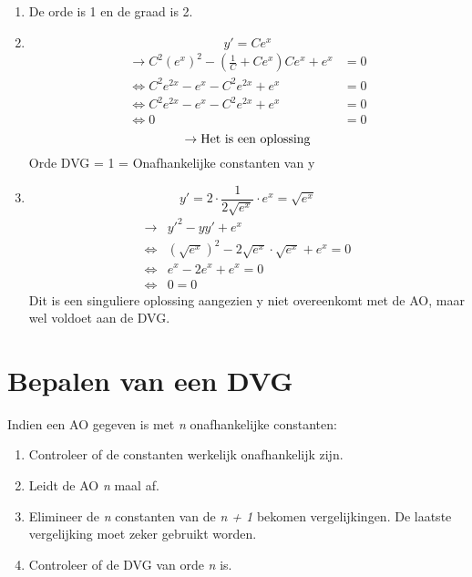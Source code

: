 {
\begin{enumerate}
\item 
De orde is 1 en de graad is 2.

\item 
$$y' = Ce^x$$
\begin{equation*}
\begin{split}
\rightarrow C^2(e^x)^2 - (\frac{1}{C} + Ce^x)Ce^x + e^x &  = 0 \\
\Leftrightarrow C^2e^{2x} - e^x - C^2e^{2x} + e^x &  = 0 \\
\Leftrightarrow C^2e^{2x} - e^x - C^2e^{2x} + e^x & = 0 \\
\Leftrightarrow 0 & =0
\end{split}
\end{equation*}
$$\rightarrow \hbox{Het is een oplossing}$$
Orde DVG = 1 = Onafhankelijke constanten van y

\item 
$$ y'  = 2 \cdot \frac{1}{2\sqrt{e^x}} \cdot e^x = \sqrt{e^x}$$
\begin{equation*}
\begin{split}
\rightarrow & y'^2 - yy'+e^x \\
\Leftrightarrow &  (\sqrt{e^x})^2 - 2\sqrt{e^x}\cdot\sqrt{e^x} + e^x  = 0 \\
\Leftrightarrow & e^x - 2e^x + e^x  = 0 \\
\Leftrightarrow & 0 = 0
\end{split}
\end{equation*}
Dit is een singuliere oplossing aangezien y niet overeenkomt met de AO, maar wel voldoet aan de DVG.

\end{enumerate}
}
\section{Bepalen van een DVG}
Indien een AO gegeven is met \textit{n} onafhankelijke constanten:
\begin{enumerate}
\item Controleer of de constanten werkelijk onafhankelijk zijn.
\item Leidt de AO \textit{n} maal af.
\item Elimineer de \textit{n} constanten van de \textit{n + 1} bekomen vergelijkingen. De laatste vergelijking moet zeker gebruikt worden.
\item Controleer of de DVG van orde \textit{n} is.
\end{enumerate}

